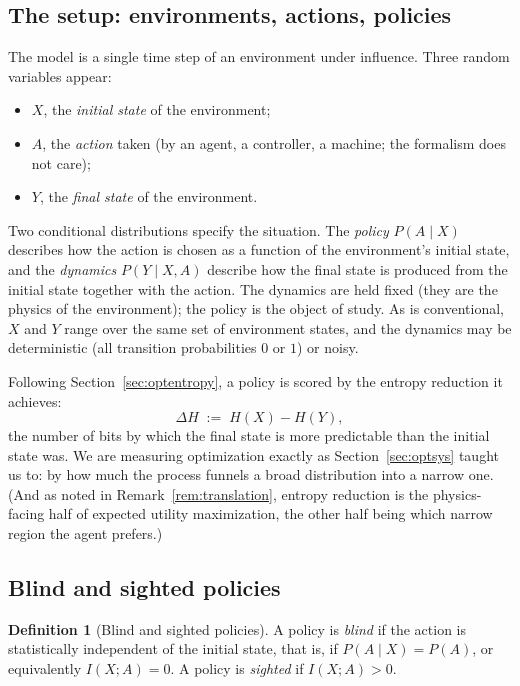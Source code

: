 \documentclass[10pt]{article}
\theoremstyle{definition}
\newtheorem{definition}[theorem]{Definition}
\theoremstyle{remark}
\begin{document}
\subsection{The setup: environments, actions, policies}
\label{sec:tlsetup}

The model is a single time step of an environment under influence. Three random variables appear:

\begin{itemize}[leftmargin=2em]
  \item $X$, the \emph{initial state} of the environment;
  \item $A$, the \emph{action} taken (by an agent, a controller, a machine; the formalism does not care);
  \item $Y$, the \emph{final state} of the environment.
\end{itemize}

Two conditional distributions specify the situation. The \emph{policy} $P(A \mid X)$ describes how the action is chosen as a function of the environment's initial state, and the \emph{dynamics} $P(Y \mid X, A)$ describe how the final state is produced from the initial state together with the action. The dynamics are held fixed (they are the physics of the environment); the policy is the object of study. As is conventional, $X$ and $Y$ range over the same set of environment states, and the dynamics may be deterministic (all transition probabilities $0$ or $1$) or noisy.

Following Section~\ref{sec:optentropy}, a policy is scored by the entropy reduction it achieves:
\[
\Delta H \;:=\; H(X) - H(Y),
\]
the number of bits by which the final state is more predictable than the initial state was. We are measuring optimization exactly as Section~\ref{sec:optsys} taught us to: by how much the process funnels a broad distribution into a narrow one. (And as noted in Remark~\ref{rem:translation}, entropy reduction is the physics-facing half of expected utility maximization, the other half being which narrow region the agent prefers.)

\subsection{Blind and sighted policies}
\label{sec:blindsighted}

\begin{definition}[Blind and sighted policies]
\label{def:blind}
A policy is \emph{blind} if the action is statistically independent of the initial state, that is, if $P(A \mid X) = P(A)$, or equivalently $I(X; A) = 0$. A policy is \emph{sighted} if $I(X; A) > 0$.
\end{definition}
\end{document}
